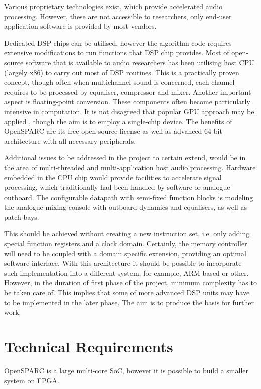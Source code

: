 \documentclass[twocolumn]{article}
\begin{document}
  Various proprietary technologies exist, which provide accelerated
  audio processing. However, these are not accessible to researchers,
  only end-user application software is provided by most vendors.


  Dedicated DSP chips can be utilised, however the algorithm code
  requires extensive modifications to run functions that DSP chip
  provides. Most of open-source software that is available to audio
  researchers \cite{wiki:pd,wiki:sc,wiki:cs} has been utilising host
  CPU (largely x86) to carry out most of DSP routines. This is a
  practically proven concept, though often when multichannel sound
  is concerned, each channel requires to be processed by equaliser,
  compressor and mixer. Another important aspect is floating-point
  conversion. These components often become particularly intensive
  in computation. It is not disagreed that popular GPU approach may
  be applied \cite{paper:gpu1,paper:gpu2}, though the aim is to
  employ a single-chip device.
  The benefits of OpenSPARC are its free open-source license as well
  as advanced 64-bit architecture with all necessary peripherals.

  Additional issues to be addressed in the project to certain extend,
  would be in the area of multi-threaded and multi-application host
  audio processing. Hardware embedded in the CPU chip would provide
  facilities to accelerate signal processing, which traditionally
  had been handled by software or analogue outboard. The configurable
  datapath with semi-fixed function blocks is modeling the analogue
  mixing console with outboard dynamics and equalisers, as well as
  patch-bays.

  This should be achieved without creating a new instruction set,
  i.e. only adding special function registers and a clock domain.
  Certainly, the memory controller will need to be coupled with
  a domain specific extension, providing an optimal software
  interface. With this architecture it should be possible to 
  incorporate such implementation into a different system,
  for example, ARM-based or other.
  However, in the duration of first phase of the project, minimum
  complexity has to be taken care of. This implies that some of
  more advanced DSP units may have to be implemented in the later
  phase. The aim is to produce the basis for further work. 

\section{Technical Requirements}

  OpenSPARC is a large multi-core SoC, however it is possible
  to build a smaller system \cite{site:oc:S1} on FPGA.
  
\end{document}
